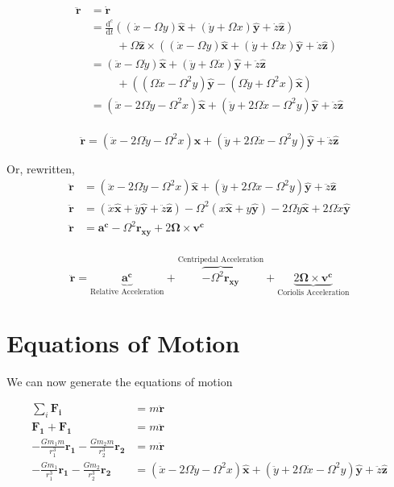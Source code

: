 \documentclass{article}
\newcommand{\dd}[2]{\frac{\mathrm{d}#1}{\mathrm{d}#2}}
\newcommand{\vv}[1]{\boldsymbol{#1}}
\newcommand{\vh}[1]{\boldsymbol{\hat{#1}}}
\begin{document}
\[
\begin{aligned}
    \vv{\ddot{r}}&=\dot{\vv{r}}\\
    &=\dd{^c}{t}\left(\left(\dot{x}-\Omega y\right)\vh{x}+\left(\dot{y}+\Omega x\right)\vh{y}+\dot{z}\vh{z}\right)\\
        &\phantom{=}\quad+\Omega \vh{z}\times\left(\left(\dot{x}-\Omega y\right)\vh{x}+\left(\dot{y}+\Omega x\right)\vh{y}+\dot{z}\vh{z}\right)\\
    &=\left(\ddot{x}-\Omega \dot{y}\right)\vh{x}+\left(\ddot{y}+\Omega \dot{x}\right)\vh{y}+\ddot{z}\vh{z}\\
        &\phantom{=}\quad+\left(\left(\Omega\dot{x}-\Omega^2 y\right)\vh{y}-\left(\Omega\dot{y}+\Omega^2 x\right)\vh{x}\right)\\
    &=\left(\ddot{x}-2\Omega\dot{y}-\Omega^2 x\right)\vh{x} + \left(\ddot{y}+2\Omega\dot{x}-\Omega^2 y\right)\vh{y}+\ddot{z}\vh{z}\\
\end{aligned}
\]

\[\boxed{\vv{\ddot{r}}=\left(\ddot{x}-2\Omega\dot{y}-\Omega^2 x\right)\vh{x} + \left(\ddot{y}+2\Omega\dot{x}-\Omega^2 y\right)\vh{y}+\ddot{z}\vh{z}}\]

Or, rewritten,
\[\begin{aligned}
    \vv{\ddot{r}} & = \left(\ddot{x}-2\Omega\dot{y}-\Omega^2 x\right)\vh{x} + \left(\ddot{y}+2\Omega\dot{x}-\Omega^2 y\right)\vh{y}+\ddot{z}\vh{z}\\
    \vv{\ddot{r}} & = \left(\ddot{x}\vh{x}+\ddot{y}\vh{y}+\ddot{z}\vh{z}\right) - \Omega^2\left(x\vh{x}+y\vh{y}\right)-2\Omega\dot{y}\vh{x} + 2\Omega\dot{x}\vh{y}\\
    \vv{\ddot{r}} & = \vv{a^c} - \Omega^2\vv{r_{xy}} + 2\vv{\Omega}\times\vv{v^c}\\
\end{aligned}\]

\[\boxed{\vv{\ddot{r}} = \underbrace{\vv{a^c}}_\text{Relative Acceleration} + \overbrace{- \Omega^2\vv{r_{xy}}}^\text{Centripedal Acceleration} + \underbrace{2\vv{\Omega}\times\vv{v^c}}_\text{Coriolis Acceleration}}\]
\section*{Equations of Motion}
We can now generate the equations of motion

\[\begin{aligned}
\sum_i \vv{F_i}&=m\vv{\ddot{r}}\\
\vv{F_1}+\vv{F_1}&=m\vv{\ddot{r}}\\
-\frac{Gm_1m}{r_1^3}\vv{r_1}-\frac{Gm_2m}{r_2^3}\vv{r_2}&=m\vv{\ddot{r}}\\
-\frac{Gm_1}{r_1^3}\vv{r_1}-\frac{Gm_2}{r_2^3}\vv{r_2}&=\left(\ddot{x}-2\Omega\dot{y}-\Omega^2 x\right)\vh{x} + \left(\ddot{y}+2\Omega\dot{x}-\Omega^2 y\right)\vh{y}+\ddot{z}\vh{z}
\end{aligned}\]
\end{document}
